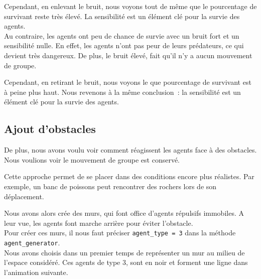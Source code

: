 \documentclass[french, a4paper, 12pt, openany]{report}
\begin{document}
   Cependant, en enlevant le bruit, nous voyons tout de même que le pourcentage de survivant reste très élevé. La sensibilité est un élément clé pour la survie des agents.\\

  Au contraire, les agents ont peu de chance de survie avec un bruit fort et un sensibilité nulle. En effet, les agents n'ont pas peur de leurs prédateurs, ce qui devient très dangereux. De plus, le bruit élevé, fait qu'il n'y a aucun mouvement de groupe.
  
  Cependant, en retirant le bruit, nous voyons le que pourcentage de survivant est à peine plus haut. Nous revenons à la même conclusion~: la sensibilité est un élément clé pour la survie des agents.
  

\subsection{Ajout d'obstacles}

   De plus, nous avons voulu voir comment réagissent les agents face à des obstacles. Nous voulions voir le mouvement de groupe est conservé. 
   
   Cette approche permet de se placer dans des conditions encore plus réalistes. Par exemple, un banc de poissons peut rencontrer des rochers lors de son déplacement. 
   
   Nous avons alors crée des murs, qui font office d'agents répulsifs immobiles. A leur vue, les agents font marche arrière pour éviter l'obstacle. \\
   
   Pour créer ces murs, il nous faut préciser \verb|agent_type = 3| dans la méthode \verb|agent_generator|.\\
   
   Nous avons choisis dans un premier temps de représenter un mur au milieu de l'espace considéré. Ces agents de type 3, sont en noir et forment une ligne dans l'animation suivante.\\
   
\end{document}
